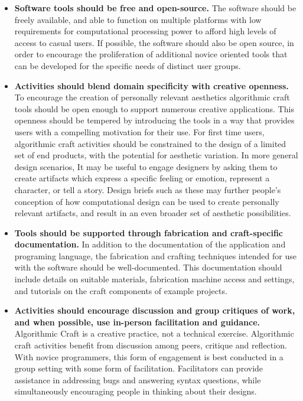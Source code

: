 \begin{itemize}
\item \textbf{ Software tools should be free and open-source.} The software should be freely available, and able to function on multiple platforms with low requirements for computational processing power to afford high levels of access to casual users. If possible, the software should also be open source, in order to encourage the proliferation of additional novice oriented tools that can be developed for the specific needs of distinct user groups. 

\item \textbf{Activities should blend domain specificity with creative openness.} To encourage the creation of personally relevant aesthetics algorithmic craft tools should be open enough to support numerous creative applications. This openness should be tempered by introducing the tools in a way that provides users with a compelling motivation for their use. For first time users, algorithmic craft activities should be constrained to the design of a limited set of end products, with the potential for aesthetic variation. In more general design scenarios, It may be useful to engage designers by asking them to create artifacts which express a specific feeling or emotion, represent a character, or tell a story. Design briefs such as these may further people's conception of how computational design can be used to create personally relevant artifacts, and result in an even broader set of aesthetic possibilities.

\item \textbf{Tools should be supported through fabrication and craft-specific documentation.} In addition to the documentation of the application and programing language, the fabrication and crafting techniques intended for use with the software should be well-documented. This documentation should include details on suitable materials, fabrication machine access and settings, and tutorials on the craft components of example projects.

\item \textbf{Activities should encourage discussion and group critiques of work, and when possible, use in-person facilitation and guidance.} Algorithmic Craft is a creative practice, not a technical exercise. Algorithmic craft activities benefit from discussion among peers, critique and reflection. With novice programmers, this form of engagement is best conducted in a group setting with some form of facilitation. Facilitators can provide assistance in addressing bugs and answering syntax questions, while simultaneously encouraging people in thinking about their designs. 


\end{itemize}
